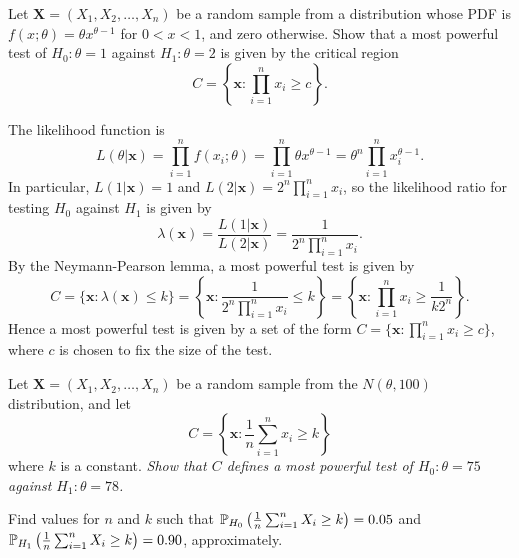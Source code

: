 \begin{exercise}
\begin{questions}
\question  %
Let $\mathbf{X}=(X_1,X_2,\ldots,X_n)$ be a random sample from a distribution whose PDF is $f(x;\theta) = \theta x^{\theta-1}$ for $0 < x < 1$, and zero otherwise.
Show that a most powerful test of $H_0:\theta=1$ against $H_1:\theta=2$ is given by the critical region
\[
C = \left\{\mathbf{x}: \displaystyle\prod_{i=1}^n x_i \geq c\right\}.
\]
\begin{answer}
The likelihood function is 
\[
L(\theta|\mathbf{x}) 
	= \prod_{i=1}^{n} f(x_i;\theta)
	= \prod_{i=1}^{n} \theta x^{\theta-1}
	= \theta^n\prod_{i=1}^{n} x_i^{\theta-1}.
\]
In particular, $L(1|\mathbf{x})=1$ and $L(2|\mathbf{x})=2^n\prod_{i=1}^{n} x_i$, so the likelihood ratio for testing $H_0$ against $H_1$ is given by
\[
\lambda(\mathbf{x})
	= \frac{L(1|\mathbf{x})}{L(2|\mathbf{x})}
	= \frac{1}{2^n\prod_{i=1}^{n} x_i}.
\]
By the Neymann-Pearson lemma, a most powerful test is given by
\[
C 	= \{\mathbf{x}:\lambda(\mathbf{x})\leq k\}
	= \left\{\mathbf{x}:\frac{1}{2^n\prod_{i=1}^{n} x_i} \leq k\right\}
	= \left\{\mathbf{x}:\prod_{i=1}^{n} x_i \geq \frac{1}{k2^n}\right\}.
\]
Hence a most powerful test is given by a set of the form $C = \big\{\mathbf{x}: \prod_{i=1}^n x_i \geq c\big\}$, where $c$ is chosen to fix the size of the test.
\end{answer}



\question  %
Let $\mathbf{X}=(X_1,X_2,\ldots,X_n)$ be a random sample from the $N(\theta,100)$ distribution, and let
\[
C = \left\{\mathbf{x}:\frac{1}{n}\sum_{i=1}^n x_i \geq k\right\}
\] 
where $k$ is a constant.
\ben
\it %
Show that $C$ defines a most powerful test of $H_0:\theta=75$ against $H_1:\theta=78$. 
\item %
Find values for $n$ and $k$ such that $\mathbb{P}_{H_0}\left(\frac{1}{n}\sum_{i=1}^n X_i\geq k\right)=0.05$ and $\mathbb{P}_{H_1}\left(\frac{1}{n}\sum_{i=1}^n X_i\geq k\right)=0.90$, approximately.
\een


\end{questions}
\end{exercise}
